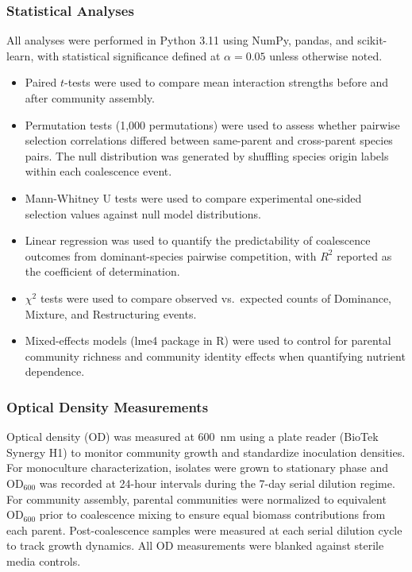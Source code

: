 \subsubsection*{Statistical Analyses}
\label{sec:suppl:statistics}

All analyses were performed in Python 3.11 using NumPy, pandas, and scikit-learn, with statistical significance defined at $\alpha = 0.05$ unless otherwise noted.

\begin{itemize}
    \item Paired $t$-tests were used to compare mean interaction strengths before and after community assembly.
    \item Permutation tests (1,000 permutations) were used to assess whether pairwise selection correlations differed between same-parent and cross-parent species pairs. The null distribution was generated by shuffling species origin labels within each coalescence event.
    \item Mann-Whitney U tests were used to compare experimental one-sided selection values against null model distributions.
    \item Linear regression was used to quantify the predictability of coalescence outcomes from dominant-species pairwise competition, with $R^2$ reported as the coefficient of determination.
    \item $\chi^2$ tests were used to compare observed vs.\ expected counts of Dominance, Mixture, and Restructuring events.
    \item Mixed-effects models (lme4 package in R) were used to control for parental community richness and community identity effects when quantifying nutrient dependence.
\end{itemize}


\subsubsection*{Optical Density Measurements}
\label{sec:suppl:od}

Optical density (OD) was measured at 600~nm using a plate reader (BioTek Synergy H1) to monitor community growth and standardize inoculation densities. For monoculture characterization, isolates were grown to stationary phase and OD$_{600}$ was recorded at 24-hour intervals during the 7-day serial dilution regime. For community assembly, parental communities were normalized to equivalent OD$_{600}$ prior to coalescence mixing to ensure equal biomass contributions from each parent. Post-coalescence samples were measured at each serial dilution cycle to track growth dynamics. All OD measurements were blanked against sterile media controls.


